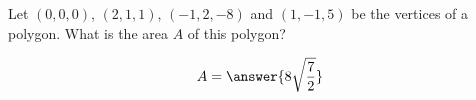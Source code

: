 \documentclass{ximera}
\author{Gregory Hartman \and Matthew Carr}
\begin{document}
\begin{exercise}

Let $(0,0,0)$, $(2,1,1)$, $(-1,2,-8)$  and $(1,-1,5)$ be the vertices of a polygon. What is the area $A$ of this polygon?
\begin{prompt}
\[
A=\answer{8\sqrt{\frac{7}{2}}}
\]
\end{prompt}


\end{exercise}
\end{document}
